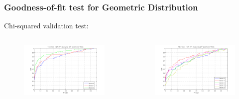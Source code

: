 \documentclass[9pt,handout,serif]{beamer}
\begin{document}
\begin{frame}
	\frametitle{Goodness-of-fit test for Geometric Distribution}
	Chi-squared validation test:
	
	\begin{columns}
		\begin{figure}
			\centering
			\includegraphics[width=1\textwidth]{../images/results/autocorrelation/localview/chi2/8sessions_cdf_p}
		\end{figure}
		\begin{figure}
			\centering
			\includegraphics[width=1\textwidth]{../images/results/autocorrelation/localview/chi2/15sessions_cdf_p}
		\end{figure}
	\end{columns}
\end{frame}
\end{document}

